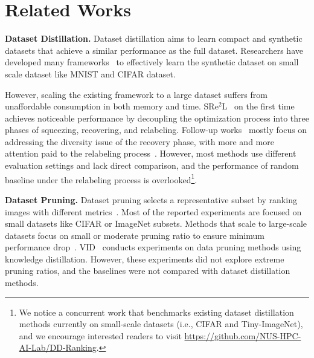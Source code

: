 \section{Related Works}
\label{sec:related}

\textbf{Dataset Distillation.}
Dataset distillation aims to learn compact and synthetic datasets that achieve a similar performance as the full dataset.
Researchers have developed many frameworks~\cite{wang2018dataset, zhao2021datasetGM, kimICML22, zhao2021dataset, cazenavette2022distillation, liu2023dream, lee2022dataset, zhao2023dataset, wang2022cafe, jiang2022delving, du2022minimizing, shin2023loss, deng2022remember, liu2022dataset, zhao2022synthesizing, wang2023dim, lorraine2020optimizing, nguyen2021dataset, nguyen2021datasetKIP, vicol2022implicit, zhou2022dataset, loo2022efficient, zhang2022accelerating, cui2023scaling, loo2023dataset} to effectively learn the synthetic dataset on small scale dataset like MNIST and CIFAR dataset.

However, scaling the existing framework to a large dataset suffers from unaffordable consumption in both memory and time.
SRe$^2$L~\cite{yin2023squeeze} on the first time achieves noticeable performance by decoupling the optimization process into three phases of squeezing, recovering, and relabeling. 
Follow-up works~\cite{yin2023dataset, sun2023diversity, dwa2024neurips, shao2023generalized, loo2024large} mostly focus on addressing the diversity issue of the recovery phase, with more and more attention paid to the relabeling process~\cite{xiao2024large, zhang2024breaking, qin2024label, kang2024label, yu2025teddy}.
However, most methods use different evaluation settings and lack direct comparison, and the performance of random baseline under the relabeling process is overlooked\footnote{We notice a concurrent work that benchmarks existing dataset distillation methods currently on small-scale datasets (i.e., CIFAR and Tiny-ImageNet), and we encourage interested readers to visit \href{https://github.com/NUS-HPC-AI-Lab/DD-Ranking}{https://github.com/NUS-HPC-AI-Lab/DD-Ranking}.}.

\textbf{Dataset Pruning.}
Dataset pruning selects a representative subset by ranking images with different metrics~\cite{coleman2020selection, toneva2018an, pleiss2020identifying, feldman2020neural, paul2021deep}. 
Most of the reported experiments are focused on small datasets like CIFAR or ImageNet subsets.
Methods that scale to large-scale datasets focus on small or moderate pruning ratio to ensure minimum performance drop~\cite{xia2023moderate, sorscher2022beyond, zheng2023coveragecentric, zhang2024spanning, grosz2024data, abbas2024effective}.
VID~\cite{ben2024distilling} conducts experiments on data pruning methods using knowledge distillation. However, these experiments did not explore extreme pruning ratios, and the baselines were not compared with dataset distillation methods.

